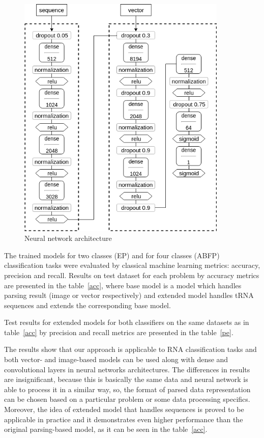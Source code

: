 \documentclass[12pt,a4paper]{cibb}
\begin{document}
\begin{figure}[h]
\begin{center}
\centering
\includegraphics[width=10cm]{nn.png}
\caption{Neural network architecture}
\label{nn}
\end{center}
\end{figure}   

The trained models for two classes (EP) and for four classes (ABFP) classification tasks were evaluated by classical machine learning metrics: accuracy, precision and recall.
Results on test dataset for each problem by accuracy metrics are presented in the table~\ref{acc}, where base model is a model which handles parsing result (image or vector respectively) and extended model handles tRNA sequences and extends the corresponding base model.



Test results for extended models for both classifiers on the same datasets as in table~\ref{acc} by precision and recall metrics  are presented in the table~\ref{pe}.




The results show that our approach is applicable to RNA classification tasks and both vector- and image-based models can be used along with dense and convolutional layers in neural networks architectures.
The differences in results are insignificant, because this is basically the same data and neural network is able to process it in a similar way, so, the format of parsed data representation can be chosen based on a particular problem or some data processing specifics.
Moreover, the idea of extended model that handles sequences is proved to be applicable in practice and it demonstrates even higher performance than the original parsing-based model, as it can be seen in the table~\ref{acc}.
\end{document}

